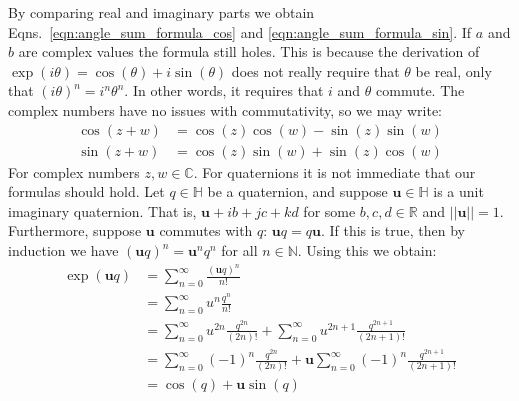 \documentclass{article}
\begin{document}
            By comparing real and imaginary parts we obtain
            Eqns.~\ref{eqn:angle_sum_formula_cos} and
            \ref{eqn:angle_sum_formula_sin}. If $a$ and $b$ are complex
            values the formula still holes. This is because the derivation
            of $\exp(i\theta)=\cos(\theta)+i\sin(\theta)$ does not really
            require that $\theta$ be real, only that
            $(i\theta)^{n}=i^{n}\theta^{n}$. In other words, it requires that
            $i$ and $\theta$ commute. The complex numbers have no issues with
            commutativity, so we may write:
            \begin{align}
                \label{eqn:angle_sum_formula_complex_cos}
                \cos(z+w)&=\cos(z)\cos(w)-\sin(z)\sin(w)\\
                \label{eqn:angle_sum_formula_complex_sin}
                \sin(z+w)&=\cos(z)\sin(w)+\sin(z)\cos(w)
            \end{align}
            For complex numbers $z,w\in\mathbb{C}$. For quaternions it is not
            immediate that our formulas should hold. Let $q\in\mathbb{H}$ be
            a quaternion, and suppose $\mathbf{u}\in\mathbb{H}$ is a unit
            imaginary quaternion. That is,
            $\mathbf{u}+ib+jc+kd$ for some $b,c,d\in\mathbb{R}$ and
            $||\mathbf{u}||=1$. Furthermore, suppose $\mathbf{u}$ commutes with
            $q$: $\mathbf{u}q=q\mathbf{u}$. If this is true, then by induction
            we have $(\mathbf{u}q)^{n}=\mathbf{u}^{n}q^{n}$ for all
            $n\in\mathbb{N}$. Using this we obtain:
            \begin{subequations}
                \begin{align}
                    \exp(\mathbf{u}q)
                    &=\sum_{n=0}^{\infty}\frac{(\mathbf{u}q)^{n}}{n!}\\
                    &=\sum_{n=0}^{\infty}u^{n}\frac{q^{n}}{n!}\\
                    &=\sum_{n=0}^{\infty}u^{2n}\frac{q^{2n}}{(2n)!}
                        +\sum_{n=0}^{\infty}u^{2n+1}\frac{q^{2n+1}}{(2n+1)!}\\
                    &=\sum_{n=0}^{\infty}(-1)^{n}\frac{q^{2n}}{(2n)!}
                        +\mathbf{u}
                        \sum_{n=0}^{\infty}(-1)^{n}\frac{q^{2n+1}}{(2n+1)!}\\
                    &=\cos(q)+\mathbf{u}\sin(q)
                \end{align}
            \end{subequations}
\end{document}
